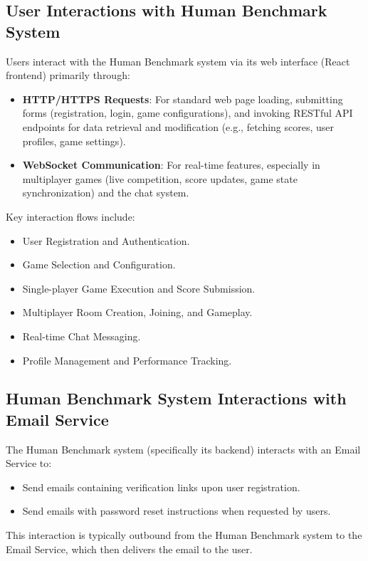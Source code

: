 \subsection{User Interactions with Human Benchmark System}
Users interact with the Human Benchmark system via its web interface (React frontend) primarily through:
\begin{itemize}
    \item \textbf{HTTP/HTTPS Requests}: For standard web page loading, submitting forms (registration, login, game configurations), and invoking RESTful API endpoints for data retrieval and modification (e.g., fetching scores, user profiles, game settings).
    \item \textbf{WebSocket Communication}: For real-time features, especially in multiplayer games (live competition, score updates, game state synchronization) and the chat system.
\end{itemize}
Key interaction flows include:
\begin{itemize}
    \item User Registration and Authentication.
    \item Game Selection and Configuration.
    \item Single-player Game Execution and Score Submission.
    \item Multiplayer Room Creation, Joining, and Gameplay.
    \item Real-time Chat Messaging.
    \item Profile Management and Performance Tracking.
\end{itemize}

\subsection{Human Benchmark System Interactions with Email Service}
The Human Benchmark system (specifically its backend) interacts with an Email Service to:
\begin{itemize}
    \item Send emails containing verification links upon user registration.
    \item Send emails with password reset instructions when requested by users.
\end{itemize}
This interaction is typically outbound from the Human Benchmark system to the Email Service, which then delivers the email to the user.

